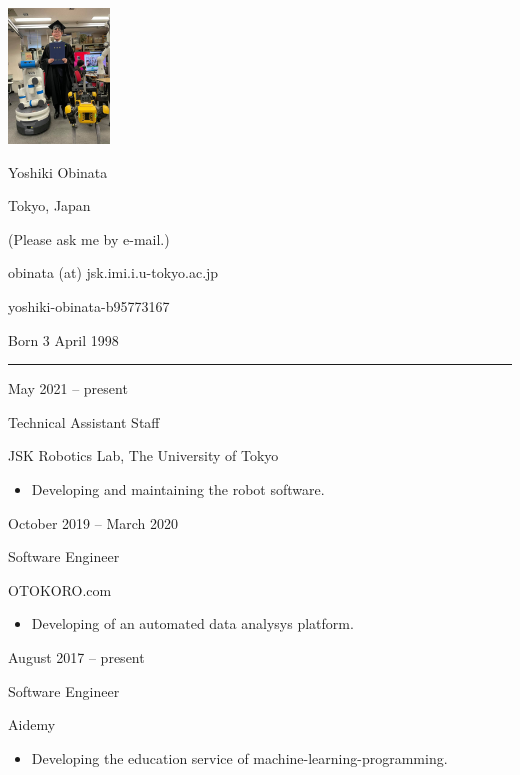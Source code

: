 \documentclass[a4paper,10pt]{article}
\newlength{\cvcolumngapwidth}
\newlength{\cvleftcolumnwidth}
\newlength{\cvrightcolumnwidth}
\newcommand{\cvnamestyle}[1]{{\Large\cvnamefont\textcolor{cvnamecolor}{#1}}}
\newcommand{\cvsectionstyle}[1]{{\normalsize\cvsectionfont\textcolor{cvsectioncolor}{#1}}}
\newcommand{\cvtitlestyle}[1]{{\large\cvtitlefont\textcolor{cvtitlecolor}{#1}}}
\newcommand{\cvdurationstyle}[1]{{\small\cvdurationfont\textcolor{cvdurationcolor}{#1}}}
\newlength{\cvafteritemskipamount}
\newlength{\cvaftersectionskipamount}
\newlength{\cvafternameskipamount}
\newlength{\cvafterpersonalinfolineskipamount}
\newlength{\cvaftertitleskipamount}
\newlength{\cvparskip}
\newcommand{\cvpersonalinfo}[2]{
    \begin{minipage}[t]{\cvleftcolumnwidth}
        \vspace{0mm} %
        \raggedleft #1
    \end{minipage}%
    \hspace{\cvcolumngapwidth}%
    \begin{minipage}[t]{\cvrightcolumnwidth}
        \vspace{0mm} %
        #2
    \end{minipage}

    \vspace{\cvafteritemskipamount}
}
\newcommand{\cvname}[1]{
    \cvnamestyle{#1}

    \vspace{\cvafternameskipamount}
}
\newcommand{\cvpersonalinfolinewithicon}[3]{
    \raisebox{.5\fontcharht\font`E-.5\height}{\texttt{[image: \#2]}}
    #3

    \vspace{\cvafterpersonalinfolineskipamount}
}
\newcommand{\cvsection}[1]{
    \begin{minipage}[t]{\cvleftcolumnwidth}
        \raggedleft\cvsectionstyle{#1}
    \end{minipage}%
    \hspace{\cvcolumngapwidth}%
    \begin{minipage}[t]{\cvrightcolumnwidth}
        \textcolor{cvrulecolor}{\rule{\cvrightcolumnwidth}{0.3mm}}
    \end{minipage}

    \vspace{\cvaftersectionskipamount}
}
\newcommand{\cvitem}[2]{
    \begin{minipage}[t]{\cvleftcolumnwidth}
        \raggedleft #1
    \end{minipage}%
    \hspace{\cvcolumngapwidth}%
    \begin{minipage}[t]{\cvrightcolumnwidth}
        \setlength{\parskip}{\cvparskip} #2
    \end{minipage}

    \vspace{\cvafteritemskipamount}
}
\newcommand{\cvtitle}[1]{
    \cvtitlestyle{#1}

    \vspace{\cvaftertitleskipamount}
    \vspace{-\cvparskip}
}
\begin{document}

\cvpersonalinfo{
    \includegraphics[height=36mm]{resources/photo.jpg}
}{
    \cvname{Yoshiki Obinata}

    \cvpersonalinfolinewithicon{height=4mm}{resources/IcoMoon-Free-PDF/072-location.pdf}{
        Tokyo, Japan
    }

    \cvpersonalinfolinewithicon{height=4mm}{resources/IcoMoon-Free-PDF/067-phone.pdf}{
        (Please ask me by e-mail.)
    }

    \cvpersonalinfolinewithicon{height=4mm}{resources/IcoMoon-Free-PDF/070-envelop.pdf}{
        obinata (at) jsk.imi.i.u-tokyo.ac.jp
    }

    \cvpersonalinfolinewithicon{height=4mm}{resources/IcoMoon-Free-PDF/458-linkedin.pdf}{
        yoshiki-obinata-b95773167
    }

    Born 3 April 1998
}



\cvsection{WORK EXPERIENCE}

\cvitem{
    \cvdurationstyle{May 2021 -- present}
}{
    \cvtitle{Technical Assistant Staff}

    JSK Robotics Lab, The University of Tokyo

    \begin{itemize}[leftmargin=*]
        \item Developing and maintaining the robot software.
    \end{itemize}
}

\cvitem{
  \cvdurationstyle{October 2019 -- March 2020}
}{
  \cvtitle{Software Engineer}
  OTOKORO.com
  \begin{itemize}[leftmargin=*]
    \item Developing of an automated data analysys platform.
  \end{itemize}
  
}

\cvitem{
    \cvdurationstyle{August 2017 -- present}
}{
    \cvtitle{Software Engineer}

    Aidemy

    \begin{itemize}[leftmargin=*]
        \item Developing the education service of machine-learning-programming.
    \end{itemize}
}
\end{document}

